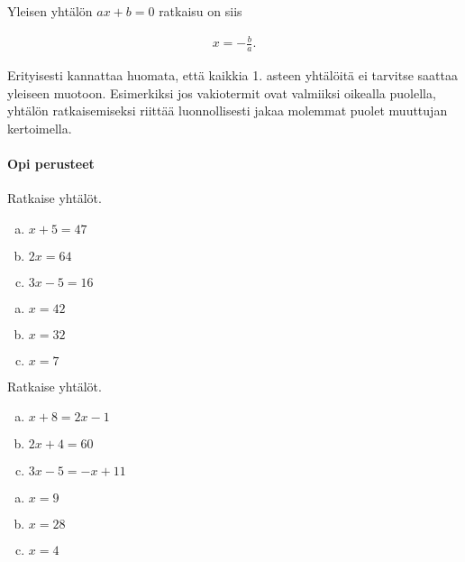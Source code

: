 Yleisen yhtälön $ax + b = 0$ ratkaisu on siis

\begin{align*}
  x = -\frac{b}{a}.
\end{align*}

Erityisesti kannattaa huomata, että kaikkia 1. asteen yhtälöitä ei tarvitse
saattaa yleiseen muotoon. Esimerkiksi jos vakiotermit ovat valmiiksi
oikealla puolella, yhtälön ratkaisemiseksi riittää luonnollisesti jakaa
molemmat puolet muuttujan kertoimella.

\Harjoitustehtavat

\paragraph*{Opi perusteet}

\begin{tehtava}
    Ratkaise yhtälöt.
    \begin{enumerate}[(a)]
        \item $x + 5 = 47$
        \item $2x = 64$
        \item $3x - 5 = 16$
    \end{enumerate}
    \begin{vastaus}
        \begin{enumerate}[(a)]
            \item $x = 42$
            \item $x = 32$
            \item $x = 7$
        \end{enumerate}
    \end{vastaus}
\end{tehtava}

\begin{tehtava}
    Ratkaise yhtälöt.
    \begin{enumerate}[(a)]
        \item $x + 8 = 2x - 1$
        \item $2x + 4 = 60$
        \item $3x - 5 = -x + 11$
    \end{enumerate}
    \begin{vastaus}
        \begin{enumerate}[(a)]
            \item $x = 9$
            \item $x = 28$
            \item $x = 4$
        \end{enumerate}
    \end{vastaus}
\end{tehtava}

